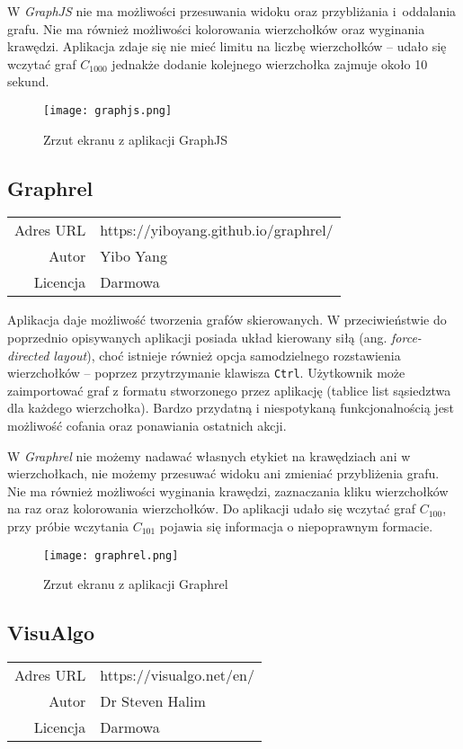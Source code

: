 W \textit{GraphJS} nie ma możliwości przesuwania widoku oraz przybliżania i~oddalania grafu. Nie ma również możliwości kolorowania wierzchołków oraz wyginania krawędzi. Aplikacja zdaje się nie mieć limitu na liczbę wierzchołków -- udało się wczytać graf $C_{1000}$ jednakże dodanie kolejnego wierzchołka zajmuje około 10 sekund.

\begin{figure}[H]
\caption{Zrzut ekranu z aplikacji GraphJS}
\centering
\texttt{[image: graphjs.png]}
\end{figure}


\subsection*{Graphrel}
\bigskip
\noindent\begin{tabularx}{\textwidth}{r|X|}
\cline{2-2}
  Adres URL & https://yiboyang.github.io/graphrel/ \\ 
\cline{2-2} 
 Autor & Yibo Yang \\
\cline{2-2}
 Licencja & Darmowa\\  
\cline{2-2}
\end{tabularx} 
\bigskip

Aplikacja daje możliwość tworzenia grafów skierowanych. W przeciwieństwie do poprzednio opisywanych aplikacji posiada układ kierowany siłą (ang. \textit{force-directed layout}), choć istnieje również opcja samodzielnego rozstawienia wierzchołków -- poprzez przytrzymanie klawisza \texttt{Ctrl}. Użytkownik może zaimportować graf z formatu stworzonego przez aplikację (tablice list sąsiedztwa dla każdego wierzchołka). Bardzo przydatną i niespotykaną funkcjonalnością jest możliwość cofania oraz ponawiania ostatnich akcji. 

W \textit{Graphrel} nie możemy nadawać własnych etykiet na krawędziach ani w wierzchołkach, nie możemy przesuwać widoku ani zmieniać przybliżenia grafu. Nie ma również możliwości wyginania krawędzi, zaznaczania kliku wierzchołków na raz oraz kolorowania wierzchołków. Do aplikacji udało się wczytać graf $C_{100}$, przy próbie wczytania $C_{101}$ pojawia się informacja o niepoprawnym formacie.

\begin{figure}[H]
\caption{Zrzut ekranu z aplikacji Graphrel}
\centering
\texttt{[image: graphrel.png]}
\end{figure}

\subsection*{VisuAlgo}
\bigskip
\noindent\begin{tabularx}{\textwidth}{r|X|}
\cline{2-2}
  Adres URL & https://visualgo.net/en/ \\ 
\cline{2-2} 
 Autor & Dr Steven Halim \\ 
\cline{2-2}
 Licencja & Darmowa\\ 
\cline{2-2}
\end{tabularx} 
\bigskip

